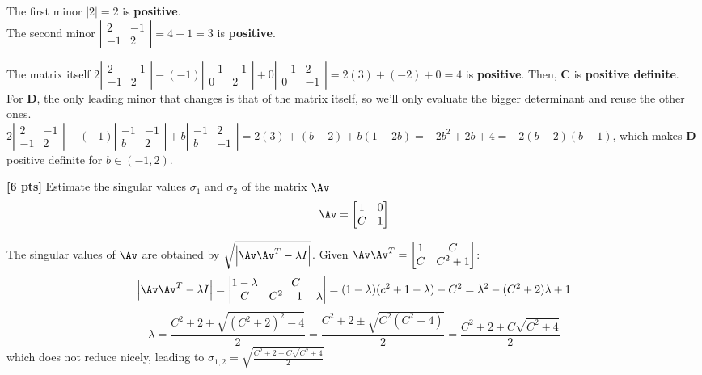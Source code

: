 \documentclass[11pt,addpoints,answers]{exam}
\numberwithin{equation}{section} %
\numberwithin{figure}{section} %
\numberwithin{table}{section} %
\newcommand{\twodet}[4]{\left|\begin{matrix} #1 & #2 \\ #3 & #4 \end{matrix}\right|}
\newcommand{\twomat}[4]{\begin{bmatrix} #1 & #2 \\ #3 & #4 \end{bmatrix}}
\begin{document}
\begin{questions}
\begin{tcolorbox}[fit,height=8cm, width=\textwidth, blank, borderline={0.5pt}{-2pt}, valign=center, nobeforeafter]
        The first minor $|2| = 2$ is \textbf{positive}.\\

        The second minor $\twodet{2}{-1}{-1}{2} = 4 - 1 = 3$ is \textbf{positive}.

        The matrix itself $2\twodet{2}{-1}{-1}{2} - (-1)\twodet{-1}{-1}{0}{2} + 0\twodet{-1}{2}{0}{-1} = 2(3) + (-2) + 0 = 4$ is \textbf{positive}. Then, \textbf{C}
        is \textbf{positive definite}.\\

        For \textbf{D}, the only leading minor that changes is that of the matrix itself, so we'll only evaluate the bigger determinant and reuse the other ones.\\

        $2\twodet{2}{-1}{-1}{2} - (-1)\twodet{-1}{-1}{b}{2} + b\twodet{-1}{2}{b}{-1} = 2(3) + (b - 2) + b(1 - 2b) = -2b^2 + 2b + 4 = -2(b - 2)(b + 1)$, which makes
        \textbf{D} positive definite for $b \in (-1, 2)$.
    \end{tcolorbox}

    \question \textbf{[6 pts]}   Estimate the singular values $\sigma_1$ and $\sigma_2$ of the matrix $\Av$
    \begin{align*}
        \Av = \begin{bmatrix}
            1 & 0 \\ C & 1
        \end{bmatrix}
    \end{align*}

    \begin{tcolorbox}[fit,height=5cm, width=\textwidth, blank, borderline={0.5pt}{-2pt}, valign=center, nobeforeafter]
        The singular values of $\Av$ are obtained by $\sqrt{\left| \Av\Av^T - \lambda I \right|}$. Given $\Av\Av^T = \twomat{1}{C}{C}{C^2 + 1}$:
        $$
            \left| \Av\Av^T - \lambda I \right| = \twodet{1 - \lambda}{C}{C}{C^2 + 1 - \lambda} = (1 - \lambda)(c^2 + 1 - \lambda) - C^2 = \lambda^2 - (C^2 + 2)\lambda + 1
        $$
        $$
            \lambda = \frac{C^2 + 2 \pm \sqrt{(C^2 + 2)^2 - 4}}{2} = \frac{C^2 + 2 \pm \sqrt{C^2(C^2 + 4)}}{2} = \frac{C^2 + 2 \pm C\sqrt{C^2 + 4}}{2}
        $$
        which does not reduce nicely, leading to $\sigma_{1, 2} = \sqrt{\frac{C^2 + 2 \pm C\sqrt{C^2 + 4}}{2}}$
    \end{tcolorbox}


\end{questions}
\end{document}
